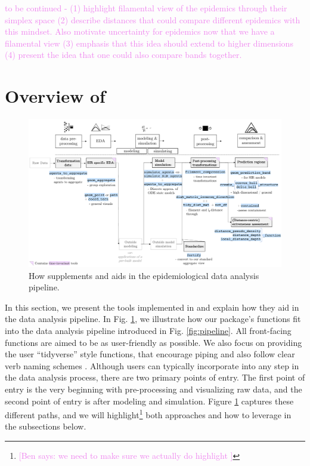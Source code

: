 \documentclass[
  shortnames]{jss}
\begin{document}
\textcolor{violet}{
to be continued - (1) highlight filamental view of the epidemics through their simplex space (2) describe distances that could compare different epidemics with this mindset. Also motivate uncertainty for epidemics now that we have a filamental view (3) emphasis that this idea should extend to higher dimensions (4) present the idea that one could also compare bands together.
}

\section[Package overview]{Overview of
}\label{sec:overview}

\afterpage{\clearpage}
\begin{figure}
    \centering
    \includegraphics[width = 1\textwidth]{images/pipeline2_1.pdf}
    \caption{How  supplements and aids in the epidemiological data analysis pipeline.}
    \label{fig:pipeline2}
\end{figure}

In this section, we present the tools implemented in 
and explain how they aid in the data analysis pipeline. In Fig.
\ref{fig:pipeline2}, we illustrate how our package's functions fit into
the data analysis pipeline introduced in Fig. \ref{fig:pipeline}. All
front-facing functions are aimed to be as user-friendly as possible. We
also focus on providing the user ``tidyverse'' style functions, that
encourage piping and also follow clear verb naming schemes
\citep{Wickham2019}. Although users can typically incorporate
 into any step in the data analysis process, there are
two primary points of entry. The first point of entry is the very
beginning with pre-processing and visualizing raw data, and the second
point of entry is after modeling and simulation. Figure
\ref{fig:pipeline2} captures these different paths, and we will
highlight\footnote{\textcolor{violet}{[Ben says: we need to make sure we actually do highlight ]}}
both approaches and how to leverage  in the subsections
below.
\end{document}
